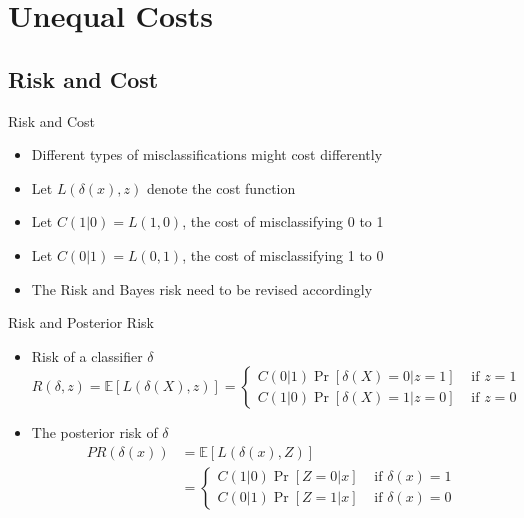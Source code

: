 \documentclass[
  ignorenonframetext,
]{beamer}
\providecommand{\tightlist}{%
  \setlength{\itemsep}{0pt}\setlength{\parskip}{0pt}}
\begin{document}
\hypertarget{unequal-costs}{%
\section{Unequal Costs}\label{unequal-costs}}

\hypertarget{risk-and-cost}{%
\subsection{Risk and Cost}\label{risk-and-cost}}

\begin{frame}{Risk and Cost}
\begin{itemize}
\tightlist
\item
  Different types of misclassifications might cost differently
\item
  Let \(L(\delta(x), z)\) denote the cost function
\item
  Let \(C(1|0)=L(1, 0)\), the cost of misclassifying 0 to 1
\item
  Let \(C(0|1)=L(0, 1)\), the cost of misclassifying 1 to 0
\item
  The Risk and Bayes risk need to be revised accordingly
\end{itemize}
\end{frame}

\begin{frame}{Risk and Posterior Risk}
\protect\hypertarget{risk-and-posterior-risk-1}{}
\begin{itemize}
\item
  Risk of a classifier \(\delta\)
  \[R(\delta, z)=\mathbb E [L(\delta(X), z)]=\left\{
  \begin{array}{cc}
  C(0|1)\Pr[\delta(X)=0|z=1] & \mbox{ if } z=1\\
  C(1|0)\Pr[\delta(X)=1|z=0] & \mbox{ if } z=0
  \end{array}\right.\]
\item
  The posterior risk of \(\delta\) \[\begin{aligned}
  PR(\delta(x)) &= \mathbb E[L(\delta(x), Z)]\\
  &=\left\{
  \begin{array}{cc}
  C(1|0)\Pr[Z=0|x] & \mbox{ if } \delta(x)=1\\
  C(0|1)\Pr[Z=1|x] & \mbox{ if } \delta(x)=0
  \end{array}\right.
  \end{aligned}\]
\end{itemize}
\end{frame}
\end{document}
